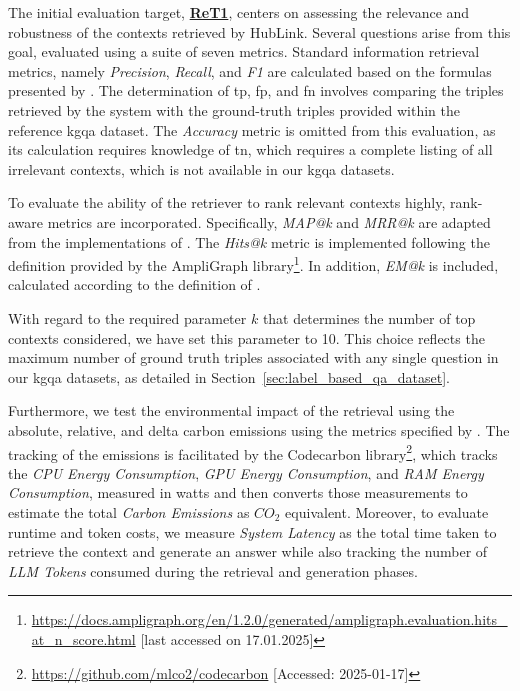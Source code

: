 The initial evaluation target, \hyperref[enum:ret1]{\textbf{ReT1}}, centers on assessing the relevance and robustness of the contexts retrieved by HubLink. Several questions arise from this goal, evaluated using a suite of seven metrics. Standard information retrieval metrics, namely \emph{Precision}, \emph{Recall}, and \emph{F1} are calculated based on the formulas presented by \textcite{yu_evaluation_2024}. The determination of \gls{tp}, \gls{fp}, and \gls{fn} involves comparing the triples retrieved by the system with the ground-truth triples provided within the reference \gls{kgqa} dataset. The \emph{Accuracy} metric is omitted from this evaluation, as its calculation requires knowledge of \gls{tn}, which requires a complete listing of all irrelevant contexts, which is not available in our \gls{kgqa} datasets.

To evaluate the ability of the retriever to rank relevant contexts highly, rank-aware metrics are incorporated. Specifically, \emph{MAP@k} and \emph{MRR@k} are adapted from the implementations of \textcite{tang_multihop-rag_2024}. The \emph{Hits@k} metric is implemented following the definition provided by the AmpliGraph library\footnote{\url{https://docs.ampligraph.org/en/1.2.0/generated/ampligraph.evaluation.hits_at_n_score.html} [last accessed on 17.01.2025]}. In addition, \emph{EM@k} is included, calculated according to the definition of \textcite{ibrahim_survey_2024}. 

With regard to the required parameter $k$ that determines the number of top contexts considered, we have set this parameter to 10. This choice reflects the maximum number of ground truth triples associated with any single question in our \gls{kgqa} datasets, as detailed in Section~\ref{sec:label_based_qa_dataset}.

Furthermore, we test the environmental impact of the retrieval using the absolute, relative, and delta carbon emissions using the metrics specified by \cite{kaplan_responsible_2025}. The tracking of the emissions is facilitated by the Codecarbon library\footnote{\url{https://github.com/mlco2/codecarbon} [Accessed: 2025-01-17]}, which tracks the \emph{CPU Energy Consumption}, \emph{GPU Energy Consumption}, and \emph{RAM Energy Consumption}, measured in watts and then converts those measurements to estimate the total \emph{Carbon Emissions} as \(CO_2\) equivalent. Moreover, to evaluate runtime and token costs, we measure \emph{System Latency} as the total time taken to retrieve the context and generate an answer while also tracking the number of \emph{LLM Tokens} consumed during the retrieval and generation phases.


